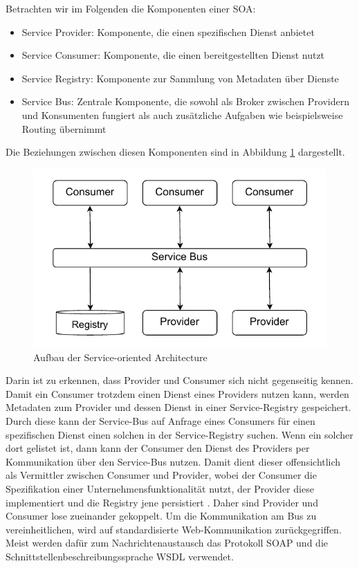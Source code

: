 \documentclass[acmtog]{acmart}
\begin{document}
Betrachten wir im Folgenden die Komponenten einer SOA:
\begin{itemize}
  \item Service Provider: Komponente, die einen spezifischen Dienst anbietet \cite{soa4}
  \item Service Consumer: Komponente, die einen bereitgestellten Dienst nutzt
  \item Service Registry: Komponente zur Sammlung von Metadaten über Dienste
  \item Service Bus: Zentrale Komponente, die sowohl als Broker zwischen Providern und Konsumenten fungiert als auch zusätzliche Aufgaben wie beispielsweise Routing übernimmt
\end{itemize}

Die Beziehungen zwischen diesen Komponenten sind in Abbildung \ref{fig:soa} dargestellt.
\begin{figure}[!h]
  \centering
  \includegraphics[width=0.8\linewidth]{images/soa/soa.pdf}
  \caption{Aufbau der Service-oriented Architecture}
  \label{fig:soa}
\end{figure}
Darin ist zu erkennen, dass Provider und Consumer sich nicht gegenseitig kennen.
Damit ein Consumer trotzdem einen Dienst eines Providers nutzen kann, werden Metadaten zum Provider und dessen Dienst in einer Service-Registry gespeichert.
Durch diese kann der Service-Bus auf Anfrage eines Consumers für einen spezifischen Dienst einen solchen in der Service-Registry suchen.
Wenn ein solcher dort gelistet ist, dann kann der Consumer den Dienst des Providers per Kommunikation über den Service-Bus nutzen.
Damit dient dieser offensichtlich als Vermittler zwischen Consumer und Provider, wobei der Consumer die Spezifikation einer Unternehmensfunktionalität nutzt,
der Provider diese implementiert und die Registry jene persistiert \cite[16]{soa2}\cite[19-26]{soa4}.
Daher sind Provider und Consumer lose zueinander gekoppelt.
Um die Kommunikation am Bus zu vereinheitlichen, wird auf standardisierte Web-Kommunikation zurückgegriffen.
Meist werden dafür zum Nachrichtenaustausch das Protokoll SOAP und die Schnittstellenbeschreibungssprache WSDL verwendet. %
\end{document}
